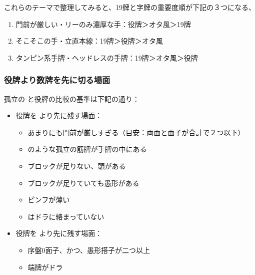 \documentclass[../nankiru_main.tex]{subfiles}
\begin{document}
%

%

これらのテーマで整理してみると、19牌と字牌の重要度順が下記の３つになる、

\begin{enumerate}
\item 門前が厳しい・リーのみ濃厚な手：役牌＞オタ風＞19牌
\item そこそこの手・立直本線：19牌＞役牌＞オタ風
\item タンピン系手牌・ヘッドレスの手牌：19牌＞オタ風＞役牌
\end{enumerate}


\subsubsection*{役牌より数牌を先に切る場面}

孤立の  と役牌の比較の基準は下記の通り：

\begin{itemize}
  \item 役牌を  より先に残す場面：
  \begin{itemize}
    \item あまりにも門前が厳しすぎる（目安：両面と面子が合計で２つ以下）
    \item {} のような孤立の筋牌が手牌の中にある
    \item ブロックが足りない、頭がある
    \item ブロックが足りていても愚形がある
    \item ピンフが薄い
    \item {} はドラに絡まっていない
  \end{itemize}
  \item 役牌を  より先に残す場面：
  \begin{itemize}
    \item 序盤0面子、かつ、愚形搭子が二つ以上
    \item 端牌がドラ
  \end{itemize}
\end{itemize}
\end{document}
